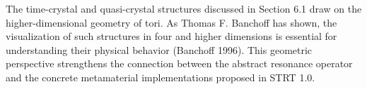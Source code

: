
The time-crystal and quasi-crystal structures discussed in Section 6.1 draw on the higher-dimensional geometry of tori. As Thomas F. Banchoff has shown, the visualization of such structures in four and higher dimensions is essential for understanding their physical behavior (Banchoff 1996). This geometric perspective strengthens the connection between the abstract resonance operator and the concrete metamaterial implementations proposed in STRT 1.0.

